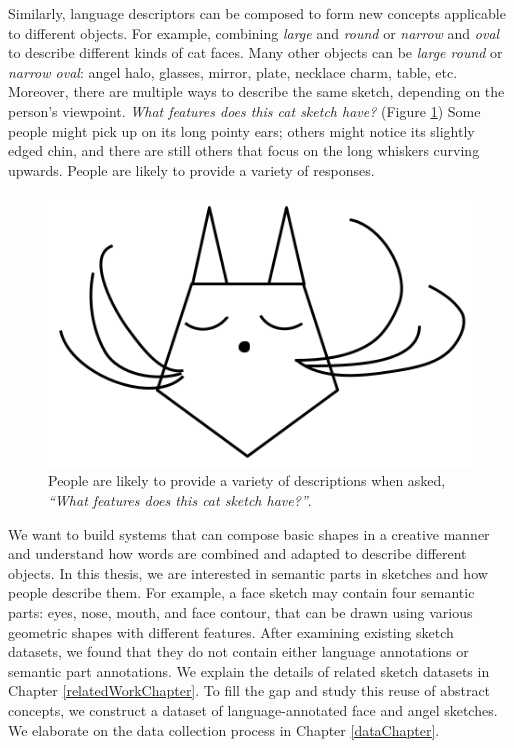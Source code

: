 Similarly, language descriptors can be composed to form new concepts applicable to different objects. For example, combining \textit{large} and \textit{round} or \textit{narrow} and \textit{oval} to describe different kinds of cat faces.
Many other objects can be \textit{large round} or \textit{narrow oval}: angel halo, glasses, mirror, plate, necklace charm, table, etc.
Moreover, there are multiple ways to describe the same sketch, depending on the person's viewpoint. \textit{What features does this cat sketch have?} (Figure \ref{introduction.cat.face}) Some people might pick up on its long pointy ears; others might notice its slightly edged chin, and there are still others that focus on the long whiskers curving upwards. People are likely to provide a variety of responses.  
\begin{figure}[!h]
\centering
\includegraphics[width=.3\linewidth]{introduction/catFace.png}  
\caption{People are likely to provide a variety of descriptions when asked, \textit{``What features does this cat sketch have?''}.}
\label{introduction.cat.face}
\end{figure}


We want to build systems that can compose basic shapes in a creative manner and understand how words are combined and adapted to describe different objects.  
In this thesis, we are interested in semantic parts in sketches and how people describe them. For example, a face sketch may contain four semantic parts: eyes, nose, mouth, and face contour, that can be drawn using various geometric shapes with different features. After examining existing sketch datasets, we found that they do not contain either language annotations or semantic part annotations. We explain the details of related sketch datasets in Chapter \ref{relatedWorkChapter}. To fill the gap and study this reuse of abstract concepts, we construct a dataset of language-annotated face and angel sketches. We elaborate on the data collection process in Chapter \ref{dataChapter}.  

